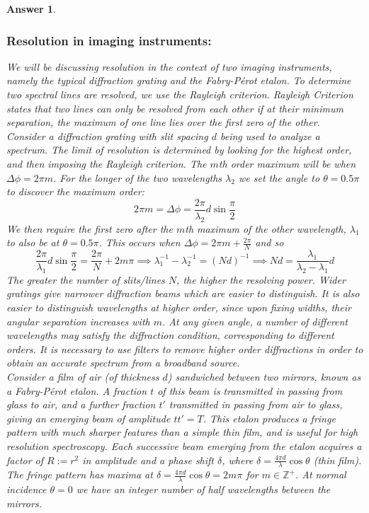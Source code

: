\documentclass[a4paper]{article}
\newtheorem{ans}{Answer}[subsection]
\theoremstyle{new}
\begin{document}
\begin{ans}
\subsubsection*{Resolution in imaging instruments:}
We will be discussing resolution in the context of two imaging instruments, namely the typical diffraction grating and the Fabry-Pérot etalon. To determine two spectral lines are resolved, we use the Rayleigh criterion. Rayleigh Criterion states that two lines can only be resolved from each other if at their minimum separation, the maximum of one line lies over the first zero of the other.\\[5pt]
Consider a diffraction grating with slit spacing $d$ being used to analyze a spectrum. The limit of resolution is determined by looking for the highest order, and then imposing the Rayleigh criterion. The $m$th order maximum will be when $\Delta\phi=2\pi m$. For the longer of the two wavelengths $\lambda_2$ we set the angle to $\theta=0.5\pi$ to discover the maximum order:
$$2\pi m=\Delta\phi=\frac{2\pi}{\lambda_2}d\sin\frac{\pi}{2}$$
We then require the first zero after the $m$th maximum of the other wavelength, $\lambda_1$ to also be at $\theta=0.5\pi$. This occurs when $\Delta\phi=2\pi m+\frac{2\pi}{N}$ and so
$$\frac{2\pi}{\lambda_1}d\sin\frac{\pi}{2}=\frac{2\pi}{N}+2m\pi\implies\lambda_1^{-1}-\lambda_2^{-1}=(Nd)^{-1}\implies Nd=\frac{\lambda_1}{\lambda_2-\lambda_1}d$$
The greater the number of slits/lines $N$, the higher the resolving power. Wider gratings give narrower diffraction beams which are easier to distinguish. It is also easier to distinguish wavelengths at higher order, since upon fixing widths, their angular separation increases with $m$. At any given angle, a number of different wavelengths may satisfy the diffraction condition, corresponding to different orders. It is necessary to use filters to remove higher order diffractions in order to obtain an accurate spectrum from a broadband source.\\[5pt]
Consider a film of air (of thickness $d$) sandwiched between two mirrors, known as a Fabry-Pérot etalon. A fraction $t$ of this beam is transmitted in passing from glass to air, and a further fraction $t'$ transmitted in passing from air to glass, giving an emerging beam of amplitude $tt'=T$. This etalon produces a fringe pattern with much sharper features than a simple thin film, and is useful for high resolution spectroscopy. Each successive beam emerging from the etalon acquires a factor of $R:=r^2$ in amplitude and a phase shift $\delta$, where $\delta=\frac{4\pi d}{\lambda}\cos\theta$ (thin film). The fringe pattern has maxima at $\delta=\frac{4\pi d}{\lambda}\cos\theta=2m\pi$ for $m\in\mathbb{Z}^+$. At normal incidence $\theta=0$ we have an integer number of half wavelengths between the mirrors.

\end{ans}
\end{document}
